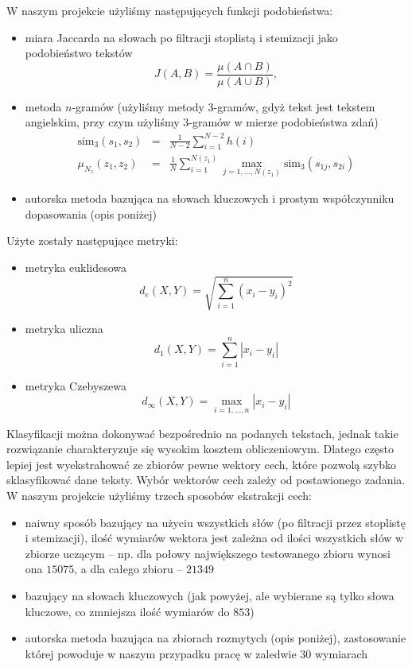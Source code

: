 \documentclass[a4paper]{classrep}
\begin{document}
W naszym projekcie użyliśmy następujących funkcji podobieństwa:
\begin{itemize}
\item miara Jaccarda na słowach po filtracji stoplistą i stemizacji jako podobieństwo tekstów
\begin{equation}
J(A,B) = \frac{\mu(A\cap B)}{\mu(A \cup B)},
\end{equation}
\item metoda \(n\)-gramów (użyliśmy metody 3-gramów, gdyż tekst jest tekstem angielskim, przy czym użyliśmy 3-gramów w mierze podobieństwa zdań)
\begin{eqnarray}
\textrm{sim}_3(s_1,s_2) & = & \frac{1}{N-2}\sum_{i=1}^{N-2}h(i) \\
\mu_{N_z}(z_1, z_2) & = & \frac{1}{N} \sum_{i=1}^{N(z_1)}\max_{j=1,\ldots,N(z_1)} \textrm{sim}_3(s_{1j}, s_{2i})
\end{eqnarray}
\item autorska metoda bazująca na słowach kluczowych i prostym współczynniku dopasowania (opis poniżej) 
\end{itemize}
Użyte zostały następujące metryki:
\begin{itemize}
\item metryka euklidesowa
\begin{equation}
d_e(X,Y)=\sqrt{\sum_{i=1}^n(x_i-y_i)^2}
\end{equation}
\item metryka uliczna
\begin{equation}
d_1(X,Y)=\sum_{i=1}^n|x_i-y_i|
\end{equation}
\item metryka Czebyszewa
\begin{equation}
d_\infty(X,Y)=\max_{i=1,\ldots,n}|x_i-y_i|
\end{equation}
\end{itemize}

Klasyfikacji można dokonywać bezpośrednio na podanych tekstach, jednak takie rozwiązanie charakteryzuje się wysokim kosztem obliczeniowym. Dlatego często lepiej jest
wyekstrahować ze zbiorów pewne wektory cech, które pozwolą szybko sklasyfikować dane teksty. Wybór wektorów cech zależy od postawionego zadania.
W naszym projekcie użyliśmy trzech sposobów ekstrakcji cech:
\begin{itemize}
\item naiwny sposób bazujący na użyciu wszystkich słów (po filtracji przez stoplistę i stemizacji), ilość wymiarów wektora jest zależna od ilości wszystkich słów w zbiorze uczącym -- np. dla połowy największego testowanego zbioru wynosi ona \(15075\), a dla całego zbioru -- \(21349\)
\item bazujący na słowach kluczowych (jak powyżej, ale wybierane są tylko słowa kluczowe, co zmniejsza ilość wymiarów do \(853\))
\item autorska metoda bazująca na zbiorach rozmytych (opis poniżej), zastosowanie której powoduje w naszym przypadku pracę w zaledwie \(30\) wymiarach
\end{itemize}
\end{document}
